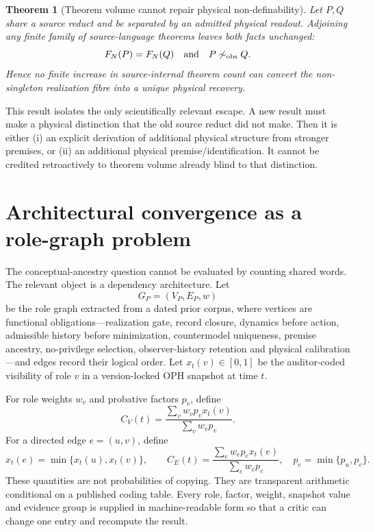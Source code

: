 \documentclass[10pt,a4paper]{article}
\newtheorem{theorem}{Theorem}[section]
\theoremstyle{definition}
\theoremstyle{remark}
\begin{document}
\begin{theorem}[Theorem volume cannot repair physical non-definability]
\label{thm:volume}
Let \(P,Q\) share a source reduct and be separated by an admitted physical
readout.  Adjoining any finite family of source-language theorems leaves both
facts unchanged:
\[
F_N(P)=F_N(Q)
\quad\text{and}\quad
P\not\sim_{\rm obs}Q.
\]
Hence no finite increase in source-internal theorem count can convert the
non-singleton realization fibre into a unique physical recovery.
\end{theorem}

This result isolates the only scientifically relevant escape.  A new result
must make a physical distinction that the old source reduct did not make.
Then it is either (i) an explicit derivation of additional physical structure
from stronger premises, or (ii) an additional physical premise/identification.
It cannot be credited retroactively to theorem volume already blind to that
distinction.



\section{Architectural convergence as a role-graph problem}
\label{sec:convergence}

The conceptual-ancestry question cannot be evaluated by counting shared words.
The relevant object is a dependency architecture.  Let
\[
G_P=(V_P,E_P,w)
\]
be the role graph extracted from a dated prior corpus, where vertices are
functional obligations---realization gate, record closure, dynamics before
action, admissible history before minimization, countermodel uniqueness,
premise ancestry, no-privilege selection, observer-history retention and
physical calibration---and edges record their logical order.  Let
\(x_t(v)\in[0,1]\) be the auditor-coded visibility of role \(v\) in a
version-locked OPH snapshot at time \(t\).

For role weights \(w_v\) and probative factors \(p_v\), define
\[
C_V(t)=\frac{\sum_v w_vp_vx_t(v)}{\sum_v w_vp_v}.
\]
For a directed edge \(e=(u,v)\), define
\[
x_t(e)=\min\{x_t(u),x_t(v)\},\qquad
C_E(t)=\frac{\sum_e w_ep_ex_t(e)}{\sum_e w_ep_e},
\quad p_e=\min\{p_u,p_v\}.
\]
These quantities are not probabilities of copying.  They are transparent
arithmetic conditional on a published coding table.  Every role, factor,
weight, snapshot value and evidence group is supplied in machine-readable
form so that a critic can change one entry and recompute the result.
\end{document}
